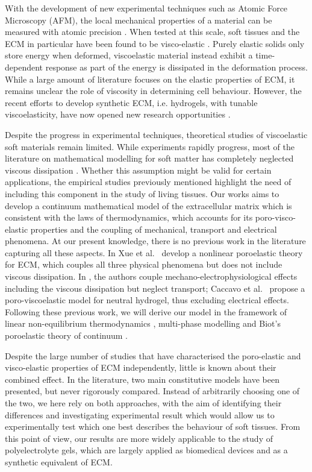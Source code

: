 \documentclass[runningheads]{llncs}
\begin{document}
With the development of new experimental techniques such as Atomic Force Microscopy (AFM), the local mechanical properties of a material can be measured with atomic precision \cite{viscoporo}. When tested at this scale, soft tissues and the ECM in particular have been found to be visco-elastic \cite{ex5}. Purely elastic solids only store energy when deformed, viscoelastic material instead exhibit a time-dependent response as part of the energy is dissipated in the deformation process. While a large amount of literature focuses on the elastic properties of ECM, it remains unclear the role of viscosity in determining cell behaviour. However, the recent efforts to develop synthetic ECM, i.e. hydrogels, with tunable viscoelasticity, have now opened new research opportunities \cite{viscocell}. 

Despite the progress in experimental techniques, theoretical studies of viscoelastic soft materials remain limited. While experiments rapidly progress, most of the literature on mathematical modelling for soft matter has completely neglected viscous dissipation \cite{Article1}. Whether this assumption might be valid for certain applications, the empirical studies previously mentioned highlight the need of including this component in the study of living tissues. Our works aims to develop a continuum mathematical model of the extracellular matrix which is consistent with the laws of thermodynamics, which accounts for its poro-visco-elastic properties and the coupling of mechanical, transport and electrical phenomena. At our present knowledge, there is no previous work in the literature capturing all these aspects. In \cite{ecm1,ecm2} Xue et al.~ develop a nonlinear poroelastic theory for ECM, which couples all three physical phenomena but does not include viscous dissipation. In \cite{Jeru}, the authors couple mechano-electrophysiological effects including the viscous dissipation but neglect transport; Caccavo et al.~ \cite{Article1} propose a poro-viscoelastic model for neutral hydrogel, thus excluding electrical effects.  Following these previous work, we will derive our model in the framework of linear non-equilibrium thermodynamics \cite{NET}, multi-phase modelling and Biot's poroelastic theory of continuum \cite{Biot}. 

Despite the large number of studies that have characterised the poro-elastic and visco-elastic properties of ECM independently, little is known about their combined effect. In the literature, two main constitutive models have been presented, but never rigorously compared.  Instead of arbitrarily choosing one of the two, we here rely on both approaches, with the aim of identifying their differences and investigating experimental result which would allow us to experimentally test which one best describes the behaviour of soft tissues. From this point of view, our results are more widely applicable to the study of polyelectrolyte gels, which are largely applied as biomedical devices and as a synthetic equivalent of ECM.
\end{document}
